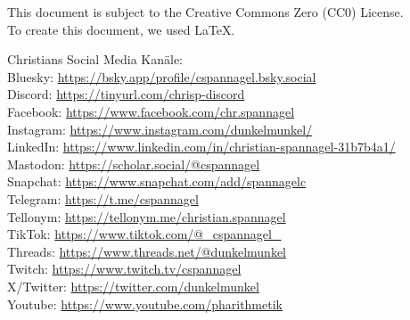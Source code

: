 \documentclass[12pt,a4paper,oneside,ngerman]{article}
\begin{document}
\tiny{This document is subject to the Creative Commons Zero (CC0) License.
\\ To create this document, we used \LaTeX{}.

Christians Social Media Kanäle:\\
Bluesky: \url{https://bsky.app/profile/cspannagel.bsky.social}\\
Discord: \url{https://tinyurl.com/chrisp-discord}\\
Facebook: \url{https://www.facebook.com/chr.spannagel}\\
Instagram: \url{https://www.instagram.com/dunkelmunkel/}\\
LinkedIn: \url{https://www.linkedin.com/in/christian-spannagel-31b7b4a1/}\\
Mastodon: \url{https://scholar.social/@cspannagel}\\
Snapchat: \url{https://www.snapchat.com/add/spannagelc}\\
Telegram: \url{https://t.me/cspannagel}\\
Tellonym: \url{https://tellonym.me/christian.spannagel}\\
TikTok: \url{https://www.tiktok.com/@_cspannagel_}\\
Threads: \url{https://www.threads.net/@dunkelmunkel}\\
Twitch: \url{https://www.twitch.tv/cspannagel}\\
X/Twitter: \url{https://twitter.com/dunkelmunkel}\\
Youtube: \url{https://www.youtube.com/pharithmetik}}\\

\end{document}
